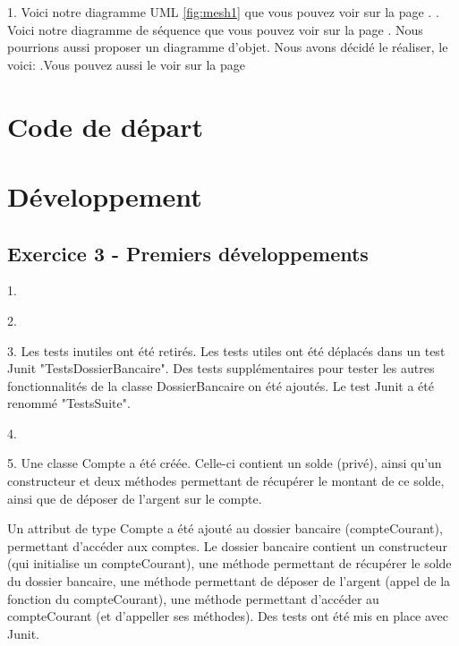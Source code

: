 \documentclass{article}
\begin{document}


1.
Voici notre diagramme UML \ref{fig:mesh1} que vous pouvez voir sur la page \pageref{fig:mesh1}.
. Voici notre diagramme de séquence %
 que vous pouvez voir sur la page%
. Nous pourrions aussi proposer un diagramme d'objet. Nous avons décidé le réaliser, le voici:
.Vous pouvez aussi le voir sur la page%


\newpage
\section{Code de départ}

\newpage
\section{Développement}
\subsection{Exercice 3 - Premiers développements}
1.

2.

3.
Les tests inutiles ont été retirés. Les tests utiles ont été déplacés dans un test Junit "TestsDossierBancaire". Des tests supplémentaires
pour tester les autres fonctionnalités de la classe DossierBancaire on été ajoutés. Le test Junit a été renommé "TestsSuite".

4.

5.
Une classe Compte a été créée. Celle-ci contient un solde (privé), ainsi qu'un constructeur et deux méthodes permettant de récupérer
le montant de ce solde, ainsi que de déposer de l'argent sur le compte.

Un attribut de type Compte a été ajouté au dossier bancaire (compteCourant), permettant d'accéder aux comptes. Le dossier bancaire
contient un constructeur (qui initialise un compteCourant), une méthode permettant de récupérer le solde du dossier bancaire, une méthode permettant de déposer de l'argent (appel de la fonction du compteCourant), une méthode permettant d'accéder au compteCourant (et d'appeller ses méthodes). Des tests ont été mis en place avec Junit.
\end{document}
